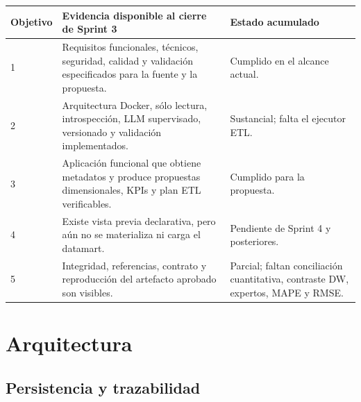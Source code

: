 \documentclass[11pt,letterpaper]{article}
\begin{document}
\begin{tabularx}{\textwidth}{@{}p{}p{}X@{}}
  \toprule
  Objetivo & Evidencia disponible al cierre de Sprint 3 & Estado acumulado \\
  \midrule
  1 & Requisitos funcionales, técnicos, seguridad, calidad y validación especificados para la fuente y la propuesta. & Cumplido en el alcance actual. \\
  2 & Arquitectura Docker, sólo lectura, introspección, LLM supervisado, versionado y validación implementados. & Sustancial; falta el ejecutor ETL. \\
  3 & Aplicación funcional que obtiene metadatos y produce propuestas dimensionales, KPIs y plan ETL verificables. & Cumplido para la propuesta. \\
  4 & Existe vista previa declarativa, pero aún no se materializa ni carga el datamart. & Pendiente de Sprint 4 y posteriores. \\
  5 & Integridad, referencias, contrato y reproducción del artefacto aprobado son visibles. & Parcial; faltan conciliación cuantitativa, contraste DW, expertos, MAPE y RMSE. \\
  \bottomrule
\end{tabularx}

\section{Arquitectura}

\begin{center}
\end{center}

\subsection{Persistencia y trazabilidad}
\end{document}
